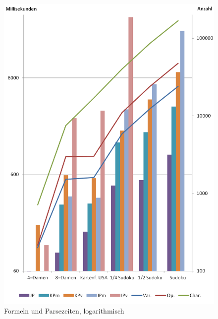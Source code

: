 \documentclass[ngerman,a4paper,abstracton,open=right,twoside=false,toc=listofnumbered,bibtotocnumbered]{scrreprt}
\begin{document}
\begin{figure}[!ht]
	\begin{center}
		\includegraphics{img/log10}
	\end{center}
	\caption{\label{parse-log}Formeln und Parsezeiten, logarithmisch}
\end{figure}
\end{document}
